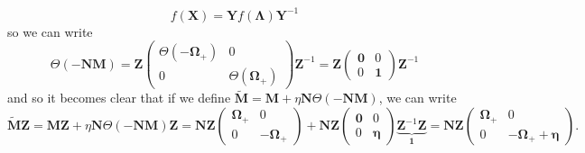 $$
f(\bm{X}) = \bm{Y} f(\bm{\Lambda}) \bm{Y}^{-1}
$$
so we can write
\begin{equation}
    \Theta(-\bm{N}\bm{M}) = \bm{Z} \left(\begin{array}{cc}\Theta(-\boldsymbol{\Omega}_{+}) & 0 \\ 0 & \Theta(\boldsymbol{\Omega}_{+})\end{array}\right)\bm{Z}^{-1} = \bm{Z} \left(\begin{array}{cc}\bm{0} & 0 \\ 0 & \bm{1}\end{array}\right)\bm{Z}^{-1}
\end{equation}
and so it becomes clear that if we define $\tilde{\bm{M}} = \bm{M} + \eta \bm{N}\Theta(-\bm{N}\bm{M})$, we can write
\begin{equation}
    \tilde{\bm{M}} \bm{Z} = \bm{M} \bm{Z} + \eta \bm{N}\Theta(-\bm{N}\bm{M}) \bm{Z} = \mathbf{N}\bm{Z}\left(\begin{array}{cc}
\boldsymbol{\Omega}_{+} & 0 \\
0 & -\boldsymbol{\Omega}_{+}
\end{array}\right) + \bm{N}\bm{Z} \left(\begin{array}{cc}\bm{0} & 0 \\ 0 & \bm{\eta}\end{array}\right) \underbrace{\bm{Z}^{-1} \bm{Z}}_{ \bm{1}} = \bm{N}\bm{Z}\left(\begin{array}{cc}\boldsymbol{\Omega}_{+} & 0 \\ 0 & -\boldsymbol{\Omega}_{+} + \bm{\eta}\end{array}\right).
\end{equation}
